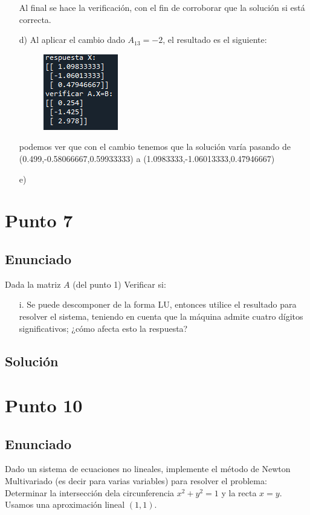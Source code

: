 \documentclass[10pt,letterpaper]{article}
\begin{document}
\begin{center}
\begin{enumerate}
\begin{figure}[H]
				\centering
			\end{figure}
			Al final se hace la verificación, con el fin de corroborar que la solución si está correcta.
			\item[d)] Al aplicar el cambio dado $A_{13}=-2$, el resultado es el siguiente:\\
			\begin{figure}[H]
				\includegraphics{imagen5}
				\centering
			\end{figure}
			podemos ver que con el cambio tenemos que la solución varía pasando de (0.499,-0.58066667,0.59933333) a (1.0983333,-1.06013333,0.47946667)
			\item[e)]
		\end{enumerate}
		
	\end{center}		
\section{Punto 7}
	
	\subsection{Enunciado}
	Dada la matriz $A$ (del punto 1) Verificar si:
	\begin{enumerate}
		\item[i.] Se puede descomponer de la forma LU, entonces utilice el resultado para resolver el sistema, teniendo en cuenta que la máquina admite cuatro dígitos significativos; ¿cómo afecta esto la respuesta?
	\end{enumerate}
	\subsection{Solución}
	
	
\section{Punto 10}
	\subsection{Enunciado}
	Dado un sistema de ecuaciones no lineales, implemente el método de Newton Multivariado (es decir para varias variables) para resolver el problema:\\
	Determinar la intersección dela circunferencia $x^2+y^2=1$ y la recta $x=y$. Usamos una aproximación lineal $(1,1)$.
\end{document}

